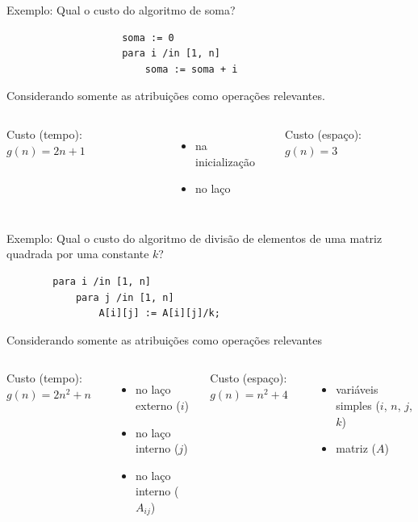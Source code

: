\begin{frame}[fragile,label=main]
	Exemplo: Qual o custo do algoritmo de soma?
		\begin{center}
			\begin{minipage}{.3\textwidth}
				\begin{lstlisting}
					soma := 0
					para i /in [1, n]
					    soma := soma + i
				\end{lstlisting}
			\end{minipage}
		\end{center}
	\pause
	Considerando somente as \alert<2>{atribuições} como operações relevantes.
	\\\vfill\pause
	\begin{columns}[T]
			Custo (tempo): \alert{$g(n) = 2n + 1$}
			\begin{itemize}
				\item[1] na inicialização
				\item[2n] no laço
			\end{itemize}
		\pause
			Custo (espaço): \alert{$g(n) = 3$}
	\end{columns}
\end{frame}

\begin{frame}[fragile,label=main]
	Exemplo: Qual o custo do algoritmo de divisão de elementos de uma matriz 
	quadrada por uma constante $k$?
	\begin{center}
	\begin{minipage}{.4\textwidth}
	\begin{lstlisting}
		para i /in [1, n]
		    para j /in [1, n]
		        A[i][j] := A[i][j]/k;
	\end{lstlisting}
	\end{minipage}
	\end{center}
	\pause
	Considerando somente as \alert<2>{atribuições} como operações relevantes
	\\\vfill\pause
	\begin{columns}[T]
			Custo (tempo): \alert{$g(n)=2n^2+n$}  
				\begin{itemize}
					\item[$n$] no laço externo ($i$)
					\item[$n^2$] no laço interno ($j$)
					\item[$n^2$] no laço interno ($A_{ij}$)
				\end{itemize}
		\pause
			Custo (espaço): \alert{$g(n) = n^2+4$} 
				\begin{itemize}
					\item[4] variáveis simples ($i$, $n$, $j$, $k$)
					\item[$n^2$] matriz ($A$)
				\end{itemize}
	\end{columns}
\end{frame}


